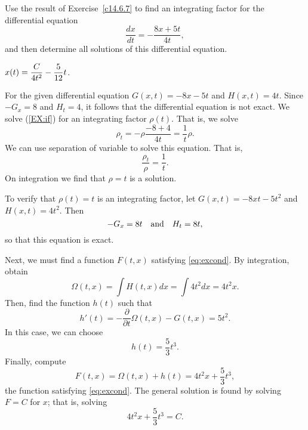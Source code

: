 \documentclass{ximera}
\begin{document}
\begin{exercise} \label{c14.6.7A}
Use the result of Exercise~\ref{c14.6.7} to find an integrating factor for 
the differential equation
\[
\frac{dx}{dt} = -\frac{8x+5t}{4t},
\]
and then determine all solutions of this differential equation.

\begin{solution}
\ans $x(t) = \displaystyle\frac{C}{4t^2} - \frac{5}{12}t$.

\soln  For the given differential equation $G(x,t)=-8x-5t$ and $H(x,t)=4t$. 
Since $-G_x=8$ and $H_t=4$, it follows that the differential equation is not
exact.  We solve (\ref{EX:if}) for an integrating factor $\rho(t)$.  That is,
we solve
\[
\rho_t = -\rho\frac{-8+4}{4t} = \frac{1}{t}\rho.
\]
We can use separation of variable to solve this equation.  That is,
\[
\frac{\rho_t}{\rho} =  \frac{1}{t}.
\]
On integration we find that $\rho=t$ is a solution.

To verify that $\rho(t)=t$ is an integrating factor, let $G(x,t)=-8xt-5t^2$
and $H(x,t)=4t^2$.  Then 
\[
-G_x = 8t \quad\mbox{and}\quad H_t = 8t,
\]
so that this equation is exact.

Next, we must find a function $F(t,x)$ satisfying \eqref{eq:excond}.  By
integration, obtain
\[
\Omega(t,x) = \int H(t,x)dx = \int 4t^2dx = 4t^2x.
\]
Then, find the function $h(t)$ such that
\[
h'(t) = -\frac{\partial}{\partial t}\Omega(t,x) - G(t,x) = 5t^2.
\]
In this case, we can choose 
\[
h(t) =  \frac{5}{3}t^3.  
\]
Finally, compute
\[
F(t,x) = \Omega(t,x) + h(t) = 4t^2x + \frac{5}{3}t^3,
\]
the function satisfying \eqref{eq:excond}.  The general solution is found by 
solving $F=C$ for $x$; that is, solving
\[
4t^2x + \frac{5}{3}t^3 = C.
\]

\end{solution}
\end{exercise}
\end{document}
